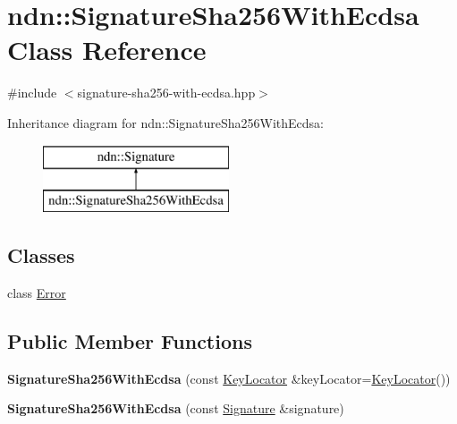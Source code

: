 \hypertarget{classndn_1_1SignatureSha256WithEcdsa}{}\section{ndn\+:\+:Signature\+Sha256\+With\+Ecdsa Class Reference}
\label{classndn_1_1SignatureSha256WithEcdsa}


{\ttfamily \#include $<$signature-\/sha256-\/with-\/ecdsa.\+hpp$>$}

Inheritance diagram for ndn\+:\+:Signature\+Sha256\+With\+Ecdsa\+:\begin{figure}[H]
\begin{center}
\leavevmode
\includegraphics[height=2.000000cm]{classndn_1_1SignatureSha256WithEcdsa}
\end{center}
\end{figure}
\subsection*{Classes}
\begin{DoxyCompactItemize}
\item 
class \hyperlink{classndn_1_1SignatureSha256WithEcdsa_1_1Error}{Error}
\end{DoxyCompactItemize}
\subsection*{Public Member Functions}
\begin{DoxyCompactItemize}
\item 
{\bfseries Signature\+Sha256\+With\+Ecdsa} (const \hyperlink{classndn_1_1KeyLocator}{Key\+Locator} \&key\+Locator=\hyperlink{classndn_1_1KeyLocator}{Key\+Locator}())\hypertarget{classndn_1_1SignatureSha256WithEcdsa_accd5dddf0a0c03034243c869caffbc08}{}\label{classndn_1_1SignatureSha256WithEcdsa_accd5dddf0a0c03034243c869caffbc08}

\item 
{\bfseries Signature\+Sha256\+With\+Ecdsa} (const \hyperlink{classndn_1_1Signature}{Signature} \&signature)\hypertarget{classndn_1_1SignatureSha256WithEcdsa_aeb3dd80191e33f26046a38b1bfc53a9c}{}\label{classndn_1_1SignatureSha256WithEcdsa_aeb3dd80191e33f26046a38b1bfc53a9c}

\end{DoxyCompactItemize}

